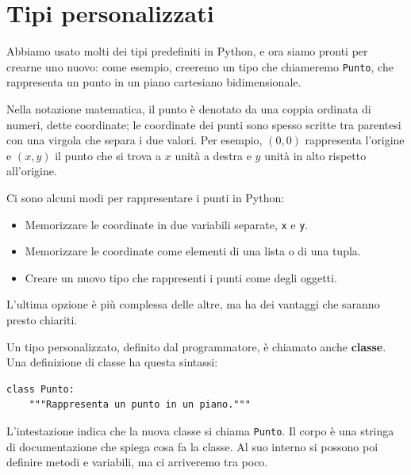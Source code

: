 \documentclass[10pt]{book}
\begin{document}
\section{Tipi personalizzati}
\label{point}

Abbiamo usato molti dei tipi predefiniti in Python, e ora siamo pronti
   per crearne uno nuovo: come esempio, creeremo un tipo che chiameremo {\tt Punto}, che rappresenta un punto in un piano cartesiano bidimensionale.

Nella notazione matematica, il punto è denotato da una coppia ordinata di numeri, dette coordinate; le coordinate dei punti sono spesso scritte tra parentesi con una virgola che separa i due valori. Per esempio, $(0,0)$ rappresenta l'origine e $(x,y)$ il punto che si trova a $x$ unità a destra e $y$ unità in alto rispetto all'origine.

Ci sono alcuni modi per rappresentare i punti in Python:

\begin{itemize}

\item Memorizzare le coordinate in due variabili separate, {\tt x} e {\tt y}.

\item Memorizzare le coordinate come elementi di una lista o di una tupla.

\item Creare un nuovo tipo che rappresenti i punti come degli oggetti.

\end{itemize}

L'ultima opzione è più complessa delle altre, ma ha dei vantaggi che saranno presto chiariti.

Un tipo personalizzato, definito dal programmatore, è chiamato anche {\bf classe}.
Una definizione di classe ha questa sintassi:

\begin{verbatim}
class Punto:
    """Rappresenta un punto in un piano."""
\end{verbatim}
%
L'intestazione indica che la nuova classe si chiama {\tt Punto}.
Il corpo è una stringa di documentazione che spiega cosa fa la classe. Al suo interno si possono poi definire metodi e variabili, ma ci arriveremo tra poco.
\end{document}
